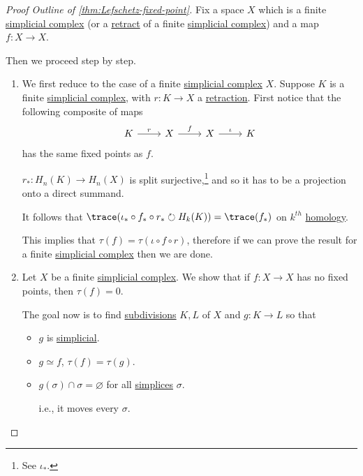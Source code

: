 \begin{proof}[Proof Outline of \autoref{thm:Lefschetz-fixed-point}]
	Fix a space \(X\) which is a finite \hyperref[def:simplicial-complex]{simplicial complex} (or a \hyperref[def:retract]{retract}
	of a finite \hyperref[def:simplicial-complex]{simplicial complex}) and a map \(f \colon X \to X\).

	Then we proceed step by step.
	\begin{enumerate}[(1)]
		\item We first reduce to the case of a finite \hyperref[def:simplicial-complex]{simplicial complex} \(X\). Suppose \(K\) is a finite
		      \hyperref[def:simplicial-complex]{simplicial complex}, with \(r \colon K \to X\) a \hyperref[def:retraction]{retraction}.
		      First notice that the following composite of maps
		      \[
			      \begin{tikzcd}
				      K & X & X & K
				      \arrow["r", from=1-1, to=1-2]
				      \arrow["f", from=1-2, to=1-3]
				      \arrow["\iota", from=1-3, to=1-4]
			      \end{tikzcd}
		      \]
		      has the same fixed points as \(f\).
		      \begin{exercise}
			      \(r_\ast \colon H_n(K) \to H_n(X)\) is split surjective,\footnote{See \(\iota_\ast\).} and so it has to be a projection onto a direct summand.
		      \end{exercise}

		      \begin{exercise}
			      It follows that \(\trace(\iota_\ast \circ f_\ast \circ r_\ast \circlearrowright H_k(K)) = \trace(f_\ast)\) on \(k^{th}\) \hyperref[def:homology-group]{homology}.
		      \end{exercise}

		      This implies that \(\tau(f) = \tau(\iota \circ f \circ r)\), therefore if we can prove the result for a
		      finite \hyperref[def:simplicial-complex]{simplicial complex} then we are done.
		\item Let \(X\) be a finite \hyperref[def:simplicial-complex]{simplicial complex}. We show that if \(f \colon X \to X\) has no fixed points, then \(\tau(f) = 0\).

		      The goal now is to find \hyperref[eg:Barycentric-subdivision]{subdivisions} \(K, L\) of \(X\) and \(g \colon K \to L\) so that
		      \begin{itemize}
			      \item \(g\) is \hyperref[def:simplicial-map]{simplicial}.
			      \item \(g \simeq f\), \(\tau(f) = \tau(g)\).
			      \item \(g(\sigma) \cap \sigma = \varnothing \) for all \hyperref[def:standard-simplex]{simplices} \(\sigma\).
			            \begin{note}
				            i.e., it moves every \(\sigma \).
			            \end{note}
		      \end{itemize}


\end{enumerate}
\end{proof}
